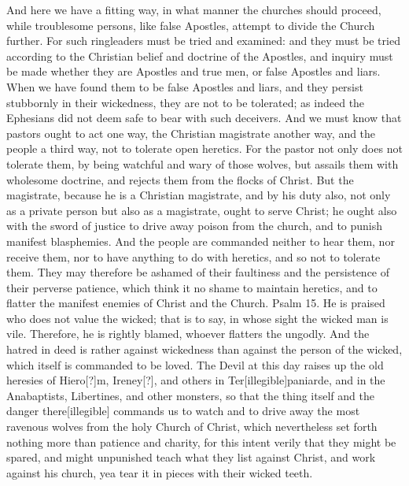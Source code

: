 And here we have a fitting way, in what manner the churches should proceed, while troublesome persons, like false Apostles, attempt to divide the Church further. For such ringleaders must be tried and examined: and they must be tried according to the Christian belief and doctrine of the Apostles, and inquiry must be made whether they are Apostles and true men, or false Apostles and liars. When we have found them to be false Apostles and liars, and they persist stubbornly in their wickedness, they are not to be tolerated; as indeed the Ephesians did not deem safe to bear with such deceivers. And we must know that pastors ought to act one way, the Christian magistrate another way, and the people a third way, not to tolerate open heretics. For the pastor not only does not tolerate them, by being watchful and wary of those wolves, but assails them with wholesome doctrine, and rejects them from the flocks of Christ. But the magistrate, because he is a Christian magistrate, and by his duty also, not only as a private person but also as a magistrate, ought to serve Christ; he ought also with the sword of justice to drive away poison from the church, and to punish manifest blasphemies. And the people are commanded neither to hear them, nor receive them, nor to have anything to do with heretics, and so not to tolerate them. They may therefore be ashamed of their faultiness and the persistence of their perverse patience, which think it no shame to maintain heretics, and to flatter the manifest enemies of Christ and the Church. Psalm 15. He is praised who does not value the wicked; that is to say, in whose sight the wicked man is vile. Therefore, he is rightly blamed, whoever flatters the ungodly. And the hatred in deed is rather against wickedness than against the person of the wicked, which itself is commanded to be loved. The Devil at this day raises up the old heresies of Hiero[?]m, Ireney[?], and others in Ter[illegible]paniarde, and in the Anabaptists, Libertines, and other monsters, so that the thing itself and the danger there[illegible] commands us to watch and to drive away the most ravenous wolves from the holy Church of Christ, which nevertheless set forth nothing more than patience and charity, for this intent verily that they might be spared, and might unpunished teach what they list against Christ, and work against his church, yea tear it in pieces with their wicked teeth.

